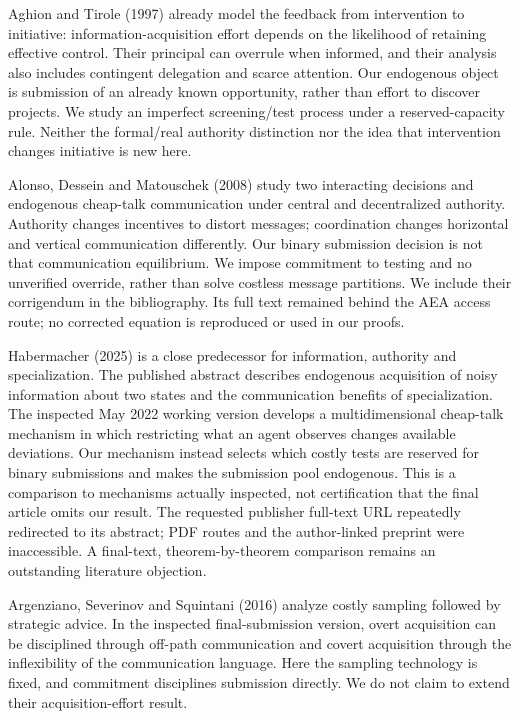 \documentclass[
  11pt,
]{article}
\begin{document}
Aghion and Tirole (1997) already model the feedback from intervention to
initiative: information-acquisition effort depends on the likelihood of
retaining effective control. Their principal can overrule when informed,
and their analysis also includes contingent delegation and scarce
attention. Our endogenous object is submission of an already known
opportunity, rather than effort to discover projects. We study an
imperfect screening/test process under a reserved-capacity rule. Neither
the formal/real authority distinction nor the idea that intervention
changes initiative is new here.

Alonso, Dessein and Matouschek (2008) study two interacting decisions
and endogenous cheap-talk communication under central and decentralized
authority. Authority changes incentives to distort messages;
coordination changes horizontal and vertical communication differently.
Our binary submission decision is not that communication equilibrium. We
impose commitment to testing and no unverified override, rather than
solve costless message partitions. We include their corrigendum in the
bibliography. Its full text remained behind the AEA access route; no
corrected equation is reproduced or used in our proofs.

Habermacher (2025) is a close predecessor for information, authority and
specialization. The published abstract describes endogenous acquisition
of noisy information about two states and the communication benefits of
specialization. The inspected May 2022 working version develops a
multidimensional cheap-talk mechanism in which restricting what an agent
observes changes available deviations. Our mechanism instead selects
which costly tests are reserved for binary submissions and makes the
submission pool endogenous. This is a comparison to mechanisms actually
inspected, not certification that the final article omits our result.
The requested publisher full-text URL repeatedly redirected to its
abstract; PDF routes and the author-linked preprint were inaccessible. A
final-text, theorem-by-theorem comparison remains an outstanding
literature objection.

Argenziano, Severinov and Squintani (2016) analyze costly sampling
followed by strategic advice. In the inspected final-submission version,
overt acquisition can be disciplined through off-path communication and
covert acquisition through the inflexibility of the communication
language. Here the sampling technology is fixed, and commitment
disciplines submission directly. We do not claim to extend their
acquisition-effort result.
\end{document}

